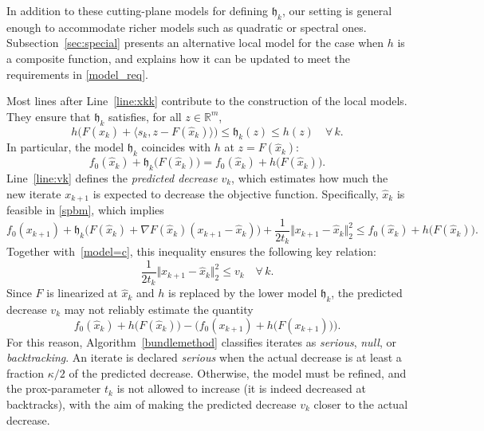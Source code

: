 \documentclass[smallextended,envcountsect]{svjour3}
\newcommand{\norm}[1]{\textstyle{\Vert} #1 \textstyle{\Vert}_2}
\newcommand{\inner}[2]{\langle#1,#2\rangle}
\renewcommand{\Re}{\mathbb{R}}
\newcommand{\modelh}{\mathfrak{h}}
\begin{document}
In addition to these cutting-plane models for defining $\modelh_k$, our setting is general enough to accommodate richer models such as quadratic \cite{Astorino_2011} or spectral \cite{Helmberg_2000} ones. Subsection~\ref{sec:special} presents an alternative local model for the case when $h$ is a composite function, and explains how it can be updated to meet the requirements in \eqref{model_req}.

Most lines after Line~\ref{line:xkk} contribute to the construction of the local models. They ensure that $\modelh_k$ satisfies, for all $z \in \Re^m$,
\[
 h\big(F(\hat x_k) + \inner{\hat s_k}{z-F(\hat x_k)}\big) \leq \modelh_k(z) \leq h(z)\quad \forall\, k. 
\]
In particular, the model $\modelh_k$ coincides with $h$ at $z=F(\hat x_k)$:
\begin{equation}\label{model=c}
f_0(\hat x_k)+\modelh_k\big(F(\hat x_k)\big) = f_0(\hat x_k)+ h\big(F(\hat x_k)\big).
\end{equation}
Line~\ref{line:vk} defines the \emph{predicted decrease} $v_k$, which estimates how much the new iterate $x_{k+1}$ is expected to decrease the objective function. Specifically, $\hat x_k$ is feasible in \eqref{spbm}, which implies
\[
f_0(x_{k+1})+\modelh_k\big(F(\hat x_k)+\nabla F(\hat x_k)(x_{k+1}-\hat x_k)\big) + \frac{1}{2t_k}\norm{x_{k+1}-\hat x_k}^2\leq f_0(\hat x_{k})+h\big(F(\hat x_k)\big).
\]
Together with~\eqref{model=c}, this inequality ensures the following key relation:
\begin{equation}\label{vk}
\frac{1}{2t_k}\norm{x_{k+1}-\hat x_k}^2 \leq  v_k \quad \forall\, k.
\end{equation}
Since $F$ is linearized at $\hat{x}_k$ and $h$ is replaced by the lower model $\modelh_k$, the predicted decrease $v_k$ may not reliably estimate the quantity
\[
f_0(\hat{x}_k) + h\big(F(\hat{x}_k)\big) - \Big(f_0(x_{k+1}) + h\big(F(x_{k+1})\big)\Big).
\]
For this reason, Algorithm~\ref{bundlemethod} classifies iterates as \emph{serious}, \emph{null}, or \emph{backtracking}. An iterate is declared \emph{serious} when the actual decrease is at least a fraction $\kappa/2$ of the predicted decrease. Otherwise, the model must be refined, and the prox-parameter $t_k$ is not allowed to increase (it is indeed decreased at backtracks), with the aim of making the predicted decrease $v_k$ closer to the actual decrease. %
%
\end{document}
